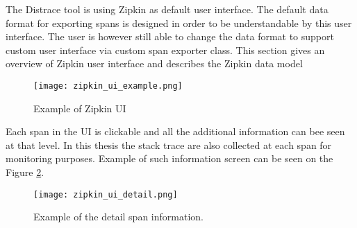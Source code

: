 The Distrace tool is using Zipkin as default user interface. The default data format for exporting spans is designed in order to be understandable by this user interface. The user is however still able to change the data format to support custom user interface via custom span exporter class. This section gives an overview of Zipkin user interface and describes the Zipkin data model


\begin{figure}
	\centering
	\texttt{[image: zipkin\_ui\_example.png]}
	\caption{Example of Zipkin UI}
	\label{fig:zipkin_ui}
\end{figure}

Each span in the UI is clickable and all the additional information can bee seen at that level. In this thesis the stack trace are also collected at each span for monitoring purposes. Example of such information screen can be seen on the Figure \ref{fig:zipkin_ui_detail}.
\begin{figure}
	\centering
	\texttt{[image: zipkin\_ui\_detail.png]}
	\caption{Example of the detail span information.}
	\label{fig:zipkin_ui_detail}
\end{figure}
